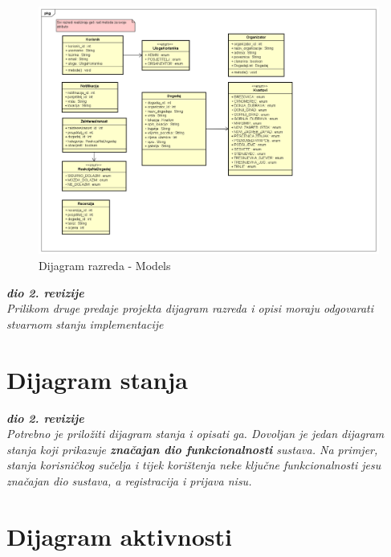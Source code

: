 			
			\begin{figure}[H]
				\includegraphics[scale=0.4]{dijagramiKlasa/Dijagram razreda - Models v4.png} %
				\centering
				\caption{Dijagram razreda - Models}
				\label{fig:promjene}
			\end{figure}
			
			\textbf{\textit{dio 2. revizije}}\\			
			
			\textit{Prilikom druge predaje projekta dijagram razreda i opisi moraju odgovarati stvarnom stanju implementacije}
			
			
			
			\eject
		
		\section{Dijagram stanja}
			
			
			\textbf{\textit{dio 2. revizije}}\\
			
			\textit{Potrebno je priložiti dijagram stanja i opisati ga. Dovoljan je jedan dijagram stanja koji prikazuje \textbf{značajan dio funkcionalnosti} sustava. Na primjer, stanja korisničkog sučelja i tijek korištenja neke ključne funkcionalnosti jesu značajan dio sustava, a registracija i prijava nisu. }
			
			
			\eject 
		
		\section{Dijagram aktivnosti}
			
